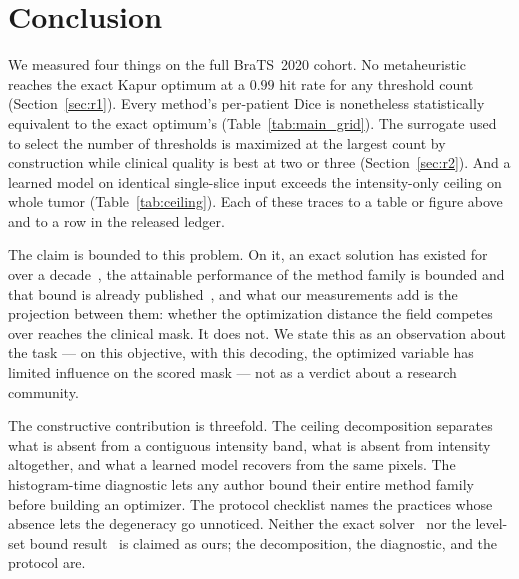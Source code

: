 \section{Conclusion}
\label{sec:conclusion}

We measured four things on the full BraTS~2020 cohort. No metaheuristic reaches
the exact Kapur optimum at a $0.99$ hit rate for any threshold count
(Section~\ref{sec:r1}). Every method's per-patient Dice is nonetheless
statistically equivalent to the exact optimum's (Table~\ref{tab:main_grid}). The
surrogate used to select the number of thresholds is maximized at the largest
count by construction while clinical quality is best at two or three
(Section~\ref{sec:r2}). And a learned model on identical single-slice input
exceeds the intensity-only ceiling on whole tumor (Table~\ref{tab:ceiling}). Each
of these traces to a table or figure above and to a row in the released ledger.

The claim is bounded to this problem. On it, an exact solution has existed for
over a decade~\cite{menotti_ciarp}, the attainable performance of the method
family is bounded and that bound is already published~\cite{francois_jmiv}, and
what our measurements add is the projection between them: whether the optimization
distance the field competes over reaches the clinical mask. It does not. We state
this as an observation about the task --- on this objective, with this decoding,
the optimized variable has limited influence on the scored mask --- not as a
verdict about a research community.

The constructive contribution is threefold. The ceiling decomposition separates
what is absent from a contiguous intensity band, what is absent from intensity
altogether, and what a learned model recovers from the same pixels. The
histogram-time diagnostic lets any author bound their entire method family before
building an optimizer. The protocol checklist names the practices whose absence
lets the degeneracy go unnoticed. Neither the exact solver~\cite{menotti_ciarp}
nor the level-set bound result~\cite{lipton_f1,francois_jmiv} is claimed as ours;
the decomposition, the diagnostic, and the protocol are.

